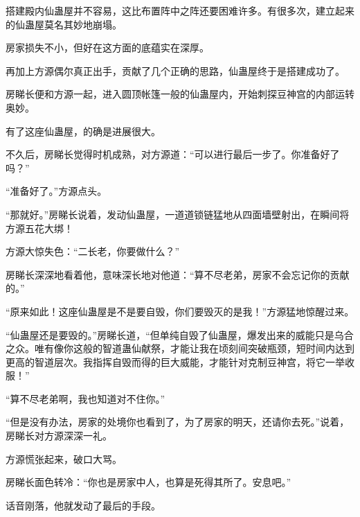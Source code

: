 \begin{this_body}
搭建殿内仙蛊屋并不容易，这比布置阵中之阵还要困难许多。有很多次，建立起来的仙蛊屋莫名其妙地崩塌。

房家损失不小，但好在这方面的底蕴实在深厚。

再加上方源偶尔真正出手，贡献了几个正确的思路，仙蛊屋终于是搭建成功了。

房睇长便和方源一起，进入圆顶帐篷一般的仙蛊屋内，开始刺探豆神宫的内部运转奥妙。

有了这座仙蛊屋，的确是进展很大。

不久后，房睇长觉得时机成熟，对方源道：“可以进行最后一步了。你准备好了吗？”

“准备好了。”方源点头。

“那就好。”房睇长说着，发动仙蛊屋，一道道锁链猛地从四面墙壁射出，在瞬间将方源五花大绑！

方源大惊失色：“二长老，你要做什么？”

房睇长深深地看着他，意味深长地对他道：“算不尽老弟，房家不会忘记你的贡献的。”

“原来如此！这座仙蛊屋是不是要自毁，你们要毁灭的是我！”方源猛地惊醒过来。

“仙蛊屋还是要毁的。”房睇长道，“但单纯自毁了仙蛊屋，爆发出来的威能只是乌合之众。唯有像你这般的智道蛊仙献祭，才能让我在顷刻间突破瓶颈，短时间内达到更高的智道层次。我指挥自毁而得的巨大威能，才能针对克制豆神宫，将它一举收服！”

“算不尽老弟啊，我也知道对不住你。”

“但是没有办法，房家的处境你也看到了，为了房家的明天，还请你去死。”说着，房睇长对方源深深一礼。

方源慌张起来，破口大骂。

房睇长面色转冷：“你也是房家中人，也算是死得其所了。安息吧。”

话音刚落，他就发动了最后的手段。

\end{this_body}

